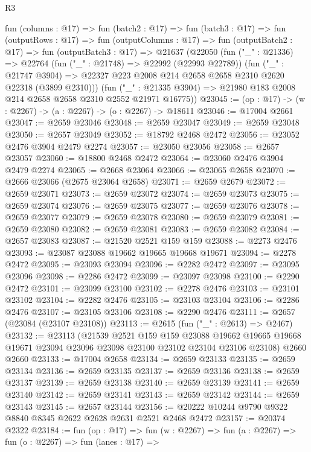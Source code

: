 \begin{lexlean}{R3}
\begin{coremodule}
  fun (columns : @17) =>
  fun (batch2 : @17) =>
  fun (batch3 : @17) =>
  fun (outputRows : @17) =>
  fun (outputColumns : @17) =>
  fun (outputBatch2 : @17) =>
  fun (outputBatch3 : @17) =>
  @21637
    (@22050
      (fun ("_" : @21336) =>
      @22764
        (fun ("_" : @21748) => @22992 (@22993 @22789))
        (fun ("_" : @21747 @3904) =>
        @22327 @223 @2008 @214 @2658 @2658 @2310 @2620 @22318 (@3899 @2310)))
      (fun ("_" : @21335 @3904) => @21980 @183 @2008 @214 @2658 @2658 @2310 @2552 @21971 @16775))
@23045 := (op : @17) -> (w : @2267) -> (a : @2267) -> (o : @2267) -> @18611
@23046 := @17004 @2661
@23047 := @2659 @23046
@23048 := @2659 @23047
@23049 := @2659 @23048
@23050 := @2657 @23049
@23052 := @18792 @2468 @2472
@23056 := @23052 @2476 @3904 @2479 @2274
@23057 := @23050 @23056
@23058 := @2657 @23057
@23060 := @18800 @2468 @2472
@23064 := @23060 @2476 @3904 @2479 @2274
@23065 := @2668 @23064
@23066 := @23065 @2658
@23070 := @2666 @23066 (@2675 @23064 @2658)
@23071 := @2659 @2679
@23072 := @2659 @23071
@23073 := @2659 @23072
@23074 := @2659 @23073
@23075 := @2659 @23074
@23076 := @2659 @23075
@23077 := @2659 @23076
@23078 := @2659 @23077
@23079 := @2659 @23078
@23080 := @2659 @23079
@23081 := @2659 @23080
@23082 := @2659 @23081
@23083 := @2659 @23082
@23084 := @2657 @23083
@23087 := @21520 @2521 @159 @159
@23088 := @2273 @2476
@23093 := @23087 @23088 @19662 @19665 @19668 @19671
@23094 := @2278 @2472
@23095 := @23093 @23094
@23096 := @2282 @2472
@23097 := @23095 @23096
@23098 := @2286 @2472
@23099 := @23097 @23098
@23100 := @2290 @2472
@23101 := @23099 @23100
@23102 := @2278 @2476
@23103 := @23101 @23102
@23104 := @2282 @2476
@23105 := @23103 @23104
@23106 := @2286 @2476
@23107 := @23105 @23106
@23108 := @2290 @2476
@23111 := @2657 (@23084 (@23107 @23108))
@23113 := @2615 (fun ("_" : @2613) => @2467)
@23132 := @23113
    (@21539
      @2521
      @159
      @159
      @23088
      @19662
      @19665
      @19668
      @19671
      @23094
      @23096
      @23098
      @23100
      @23102
      @23104
      @23106
      @23108)
    @2660
    @2660
@23133 := @17004 @2658
@23134 := @2659 @23133
@23135 := @2659 @23134
@23136 := @2659 @23135
@23137 := @2659 @23136
@23138 := @2659 @23137
@23139 := @2659 @23138
@23140 := @2659 @23139
@23141 := @2659 @23140
@23142 := @2659 @23141
@23143 := @2659 @23142
@23144 := @2659 @23143
@23145 := @2657 @23144
@23156 := @20222 @10244 @9790 @9322 @8840 @8345 @2622 @2628 @2631 @2521 @2468 @2472
@23157 := @20374 @2322
@23184 := fun (op : @17) =>
  fun (w : @2267) =>
  fun (a : @2267) =>
  fun (o : @2267) =>
  fun (lanes : @17) =>

\end{coremodule}
\end{lexlean}
